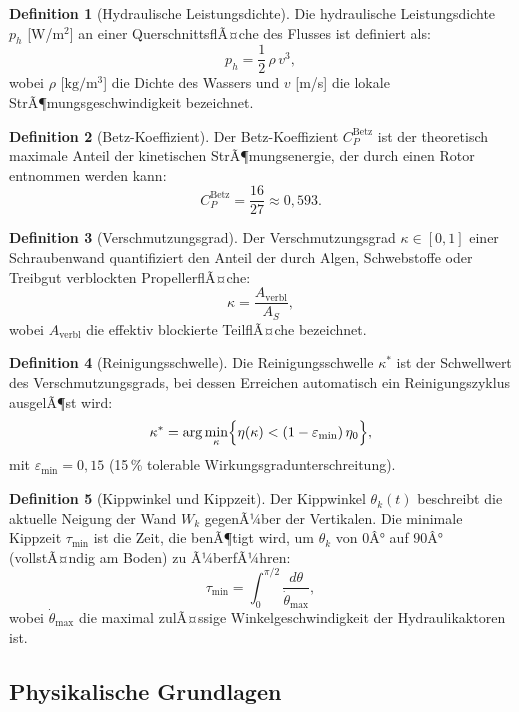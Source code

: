 ﻿\documentclass[a4paper,12pt]{article}
\theoremstyle{definition}
\newtheorem{definition}{Definition}
\begin{document}
\begin{definition}[Hydraulische Leistungsdichte]
Die hydraulische Leistungsdichte $p_h$ [W/m$^2$] an einer QuerschnittsflÃ¤che des
Flusses ist definiert als:
\[
  p_h = \frac{1}{2}\,\rho\,v^3,
\]
wobei $\rho$ [$\mathrm{kg/m^3}$] die Dichte des Wassers und $v$ [m/s] die lokale
StrÃ¶mungsgeschwindigkeit bezeichnet.
\end{definition}

\begin{definition}[Betz-Koeffizient]
Der Betz-Koeffizient $C_P^{\mathrm{Betz}}$ ist der theoretisch maximale Anteil der
kinetischen StrÃ¶mungsenergie, der durch einen Rotor entnommen werden kann:
\[
  C_P^{\mathrm{Betz}} = \frac{16}{27} \approx 0{,}593.
\]
\end{definition}

\begin{definition}[Verschmutzungsgrad]
Der Verschmutzungsgrad $\kappa \in [0, 1]$ einer Schraubenwand quantifiziert den Anteil
der durch Algen, Schwebstoffe oder Treibgut verblockten PropellerflÃ¤che:
\[
  \kappa = \frac{A_{\mathrm{verbl}}}{A_S},
\]
wobei $A_{\mathrm{verbl}}$ die effektiv blockierte TeilflÃ¤che bezeichnet.
\end{definition}

\begin{definition}[Reinigungsschwelle]
Die Reinigungsschwelle $\kappa^*$ ist der Schwellwert des Verschmutzungsgrads, bei
dessen Erreichen automatisch ein Reinigungszyklus ausgelÃ¶st wird:
\[
  \kappa^* = \arg\min_{\kappa} \Bigl\{\eta(\kappa) < (1 - \varepsilon_{\mathrm{min}})\,\eta_0\Bigr\},
\]
mit $\varepsilon_{\mathrm{min}} = 0{,}15$ (15\,\% tolerable Wirkungsgradunterschreitung).
\end{definition}

\begin{definition}[Kippwinkel und Kippzeit]
Der Kippwinkel $\theta_k(t)$ beschreibt die aktuelle Neigung der Wand $W_k$ gegenÃ¼ber
der Vertikalen. Die minimale Kippzeit $\tau_{\mathrm{min}}$ ist die Zeit, die benÃ¶tigt wird,
um $\theta_k$ von $0Â°$ auf $90Â°$ (vollstÃ¤ndig am Boden) zu Ã¼berfÃ¼hren:
\[
  \tau_{\mathrm{min}} = \int_0^{\pi/2} \frac{d\theta}{\dot{\theta}_{\mathrm{max}}},
\]
wobei $\dot{\theta}_{\mathrm{max}}$ die maximal zulÃ¤ssige Winkelgeschwindigkeit der
Hydraulikaktoren ist.
\end{definition}

\subsection{Physikalische Grundlagen}
\end{document}
